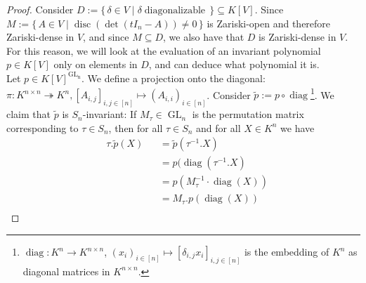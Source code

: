 \begin{proof}
  Consider $D := \{\, \delta \in V \mid \delta \operatorname{diagonalizable} \,\} \subseteq K[V]$.
  Since $M := \{\, A \in V \mid \operatorname{disc}(\operatorname{det}(tI_n - A)) \neq 0 \,\}$ is Zariski-open and therefore Zariski-dense in $V$, and since $M \subseteq D$, we also have that $D$ is Zariski-dense in $V$.
  For this reason, we will look at the evaluation of an invariant polynomial $p \in K[V] $ only on elements in $D$, and can deduce what polynomial it is.  \\
  Let $p \in K[V]^{\operatorname{GL_n}}$.
  We define a projection onto the diagonal:
  $\pi \colon K^{n \times n} \twoheadrightarrow K^n , [A_{i,j}]_{i,j \in [n]} \longmapsto (A_{i,i})_{i \in [n]} $.
  Consider $\tilde{p} := p \circ \operatorname{diag}$\footnote{$\operatorname{diag} \colon K^n \rightarrow K^{n \times n}$, $(x_i)_{i\in[n]} \mapsto [\delta_{i,j}x_i]_{i,j \in [n]}$ is the embedding of $K^n$ as diagonal matrices in $K^{n\times n}$.}.
  We claim that $\tilde{p}$ is $S_n$-invariant:
  If $M_\tau \in \operatorname{GL}_n$ is the permutation matrix corresponding to $\tau \in S_n$, then for all $\tau \in S_n$ and for all $ X \in K^n$ we have
  \begin{equation}
    \begin{aligned}
      &\tau.\tilde{p} (X) &&= \tilde{p} (\tau^{-1}.X)\\
      &&&= p ( \operatorname{diag}(\tau^{-1}.X)\\
      &&&= p( M_\tau^{-1} \cdot \operatorname{diag} (X))\\
      &&&= M_\tau . p (\operatorname{diag}(X))\\

\end{aligned}
\end{equation}
\end{proof}
